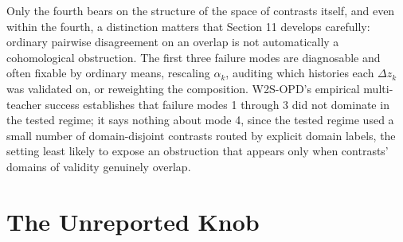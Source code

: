 \documentclass[11pt]{article}
\begin{document}
Only the fourth bears on the structure of the space of contrasts itself, and even within the fourth, a distinction matters that Section 11 develops carefully: ordinary pairwise disagreement on an overlap is not automatically a cohomological obstruction. The first three failure modes are diagnosable and often fixable by ordinary means, rescaling $\alpha_k$, auditing which histories each $\Delta z_k$ was validated on, or reweighting the composition. W2S-OPD's empirical multi-teacher success establishes that failure modes 1 through 3 did not dominate in the tested regime; it says nothing about mode 4, since the tested regime used a small number of domain-disjoint contrasts routed by explicit domain labels, the setting least likely to expose an obstruction that appears only when contrasts' domains of validity genuinely overlap.

\section{The Unreported Knob}
\end{document}
